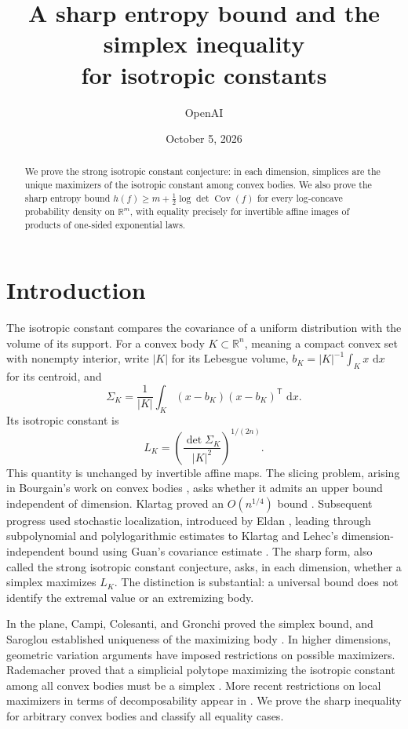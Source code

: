 \documentclass[11pt]{article}
\title{A sharp entropy bound and the simplex inequality\protect\\ for isotropic constants}
\author{OpenAI}
\date{October 5, 2026}
\theoremstyle{definition}
\theoremstyle{remark}
\numberwithin{equation}{section}
\begin{document}
\begin{abstract}
We prove the strong isotropic constant conjecture: in each dimension,
simplices are the unique maximizers of the isotropic constant among
convex bodies. We also prove the sharp entropy bound
$h(f)\ge m+\tfrac12\log\det\operatorname{Cov}(f)$ for every log-concave probability
density on $\mathbb R^m$, with equality precisely for invertible affine
images of products of one-sided exponential laws.
\end{abstract}

\section{Introduction}

The isotropic constant compares the covariance of a uniform distribution
with the volume of its support.  For a convex body $K\subset\mathbb R^n$,
meaning a compact convex set with nonempty interior, write $|K|$ for its
Lebesgue volume, $b_K=|K|^{-1}\int_Kx\,\,\mathrm d x$ for its centroid, and
\[
 \Sigma_K=\frac1{|K|}\int_K(x-b_K)(x-b_K)^{\mathsf T}\,\,\mathrm d x.
\]
Its isotropic constant is
\begin{equation}\label{intro:isotropic-constant}
 L_K=\left(\frac{\det\Sigma_K}{|K|^2}\right)^{1/(2n)}.
\end{equation}
This quantity is unchanged by invertible affine maps.  The slicing
problem, arising in Bourgain's work on convex bodies
\cite{Bourgain1986}, asks whether it admits an upper bound independent
of dimension.  Klartag proved an $O(n^{1/4})$ bound
\cite{Klartag2006}.  Subsequent progress used stochastic localization,
introduced by Eldan \cite{Eldan2013}, leading through subpolynomial
and polylogarithmic estimates \cite{Chen2021,KlartagLehec2022,Klartag2023}
to Klartag and Lehec's dimension-independent bound using Guan's
covariance estimate \cite{Guan2024,KlartagLehec2025}.
The sharp form, also called the strong isotropic constant conjecture,
asks, in each dimension, whether a simplex maximizes $L_K$.
The distinction is substantial: a universal bound does not
identify the extremal value or an extremizing body.

In the plane, Campi, Colesanti, and Gronchi proved the simplex bound,
and Saroglou established uniqueness of the maximizing body
\cite{CampiColesantiGronchi1999,Saroglou2010}.
In higher dimensions, geometric variation arguments have imposed
restrictions on possible maximizers.  Rademacher proved that a
simplicial polytope maximizing the isotropic constant among all convex
bodies must be a simplex \cite{Rademacher2016}. More recent restrictions on local
maximizers in terms of decomposability appear in \cite{Kipp2026}.
We prove the sharp inequality for arbitrary convex bodies and classify
all equality cases.
\end{document}
